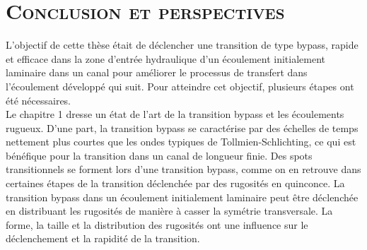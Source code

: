

{}

\chead[\fancyplain{}{}]
      {\fancyplain{}{}}
\lfoot[\fancyplain{}{}]
      {\fancyplain{}{}}
\cfoot[\fancyplain{}{\thepage}]
      {\fancyplain{}{\thepage}}
\rfoot[\fancyplain{}{}]
     {\fancyplain{}{\scriptsize}}


\chapter*{\lettrine[lines=1]{C}{onclusion et perspectives}}
\label{ch/conclusion}

\null\vfill
L'objectif de cette thèse était de déclencher une transition de type bypass, rapide et efficace dans la zone d'entrée hydraulique d'un écoulement initialement laminaire dans un canal pour améliorer le processus de transfert dans l'écoulement développé qui suit. Pour atteindre cet objectif, plusieurs étapes ont été nécessaires.\\

\vspace{1cm}
Le chapitre 1 dresse un état de l'art de la transition bypass et les écoulements rugueux. D'une part, la transition bypass se caractérise par des échelles de temps nettement plus courtes que les ondes typiques de Tollmien-Schlichting, ce qui est bénéfique pour la transition dans un canal de longueur finie. Des spots transitionnels se forment lors d’une transition bypass, comme on en retrouve dans certaines étapes de la transition déclenchée par des rugosités en quinconce. La transition bypass dans un écoulement initialement laminaire peut être déclenchée en distribuant les rugosités de manière à casser la symétrie transversale. La forme, la taille et la distribution des rugosités ont une influence sur le déclenchement et la rapidité de la transition.\\

